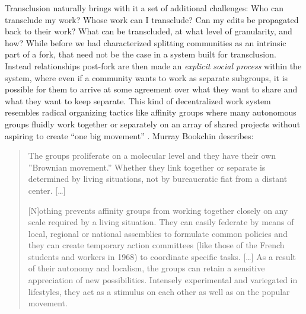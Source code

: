 \documentclass[10pt]{article}
\begin{document}
\begin{multicols}{2}
Transclusion naturally brings with it a set of additional challenges:
Who can transclude my work? Whose work can I transclude? Can my edits be
propagated back to their work? What can be transcluded, at what level of
granularity, and how? While before we had characterized splitting
communities as an intrinsic part of a fork, that need not be the case in
a system built for transclusion. Instead relationships post-fork are
then made an \emph{explicit social process} within the system, where
even if a community wants to work as separate subgroups, it is possible
for them to arrive at some agreement over what they want to share and
what they want to keep separate. This kind of decentralized work system
resembles radical organizing tactics like affinity groups where many
autonomous groups fluidly work together or separately on an array of
shared projects without aspiring to create ``one big movement'' \cite{kleinWereDCSeattle2001} . Murray Bookchin describes:

\begin{quote}
The groups proliferate on a molecular level and they have their own
''Brownian movement.'' Whether they link together or separate is
determined by living situations, not by bureaucratic fiat from a distant
center. {[}\ldots{]}

{[}N{]}othing prevents affinity groups from working together closely on
any scale required by a living situation. They can easily federate by
means of local, regional or national assemblies to formulate common
policies and they can create temporary action committees (like those of
the French students and workers in 1968) to coordinate specific tasks.
{[}\ldots{]} As a result of their autonomy and localism, the groups can
retain a sensitive appreciation of new possibilities. Intensely
experimental and variegated in lifestyles, they act as a stimulus on
each other as well as on the popular movement. \cite{bookchinNoteAffinityGroups1969} 
\end{quote}


\end{multicols}
\end{document}
